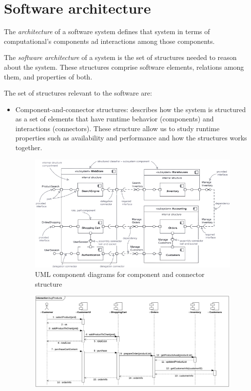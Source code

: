 \documentclass[12pt, a4paper]{report}
\begin{document}
        \section{Software architecture}
            \begin{definition}
                The \emph{architecture} of a software system defines that system in terms of computational's components ad interactions among those components.

                The \emph{software architecture} of a system is the set of structures needed to reason about the system. 
                These structures comprise software elements, relations among them, and properties of both. 
            \end{definition}
            The set of structures relevant to the software are: 
            \begin{itemize}
                \item Component-and-connector structures: describes how the system is structured as a set of elements that have runtime behavior (components) and interactions (connectors).
                    These structure allow us to study runtime properties such as availability and performance and how the structures works together. 
                    \begin{figure}[H]
                        \centering
                        \includegraphics[width=0.75\linewidth]{images/component1.png}
                        \caption{UML component diagrams for component and connector structure}
                    \end{figure}
                    \begin{figure}[H]
                        \centering
                        \includegraphics[width=0.75\linewidth]{images/component2.png}

\end{figure}
\end{itemize}
\end{document}
